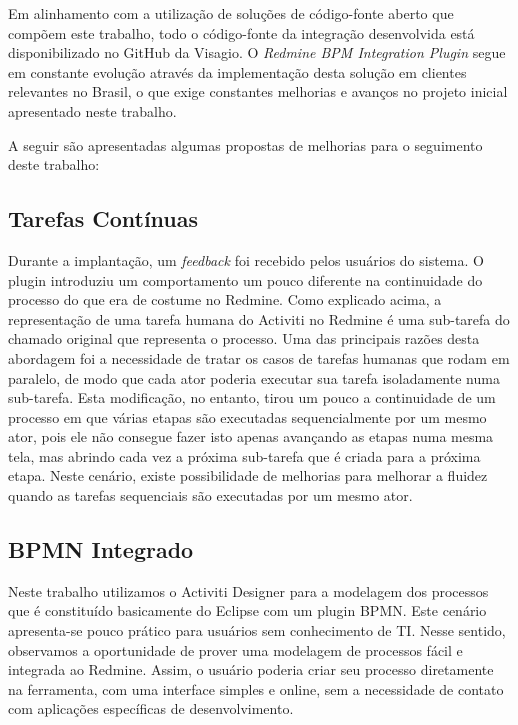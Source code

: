 Em alinhamento com a utilização de soluções de código-fonte aberto que compõem este trabalho, todo o código-fonte da integração desenvolvida está disponibilizado no GitHub da Visagio\cite{github_visagio}. O \textit{Redmine BPM Integration Plugin} segue em constante evolução através da implementação desta solução em clientes relevantes no Brasil, o que exige constantes melhorias e avanços no projeto inicial apresentado neste trabalho.

A seguir são apresentadas algumas propostas de melhorias para o seguimento deste trabalho:

\subsection{Tarefas Contínuas}

Durante a implantação, um \textit{feedback} foi recebido pelos usuários do sistema. O plugin introduziu um comportamento um pouco diferente na continuidade do processo do que era de costume no Redmine. Como explicado acima, a representação de uma tarefa humana do Activiti no Redmine é uma sub-tarefa do chamado original que representa o processo. Uma das principais razões desta abordagem foi a necessidade de tratar os casos de tarefas humanas que rodam em paralelo, de modo que cada ator poderia executar sua tarefa isoladamente numa sub-tarefa. 
Esta modificação, no entanto, tirou um pouco a continuidade de um processo em que várias etapas são executadas sequencialmente por um mesmo ator, pois ele não consegue fazer isto apenas avançando as etapas numa mesma tela, mas abrindo cada vez a próxima sub-tarefa que é criada para a próxima etapa. Neste cenário, existe possibilidade de melhorias para melhorar a fluidez quando as tarefas sequenciais são executadas por um mesmo ator.

\subsection{BPMN Integrado}

Neste trabalho utilizamos o Activiti Designer para a modelagem dos processos que é constituído basicamente do Eclipse com um plugin BPMN. Este cenário apresenta-se pouco prático para usuários sem conhecimento de TI. Nesse sentido, observamos a oportunidade de prover uma modelagem de processos fácil e integrada ao Redmine. Assim, o usuário poderia criar seu processo diretamente na ferramenta, com uma interface simples e online, sem a necessidade de contato com aplicações específicas de desenvolvimento.

